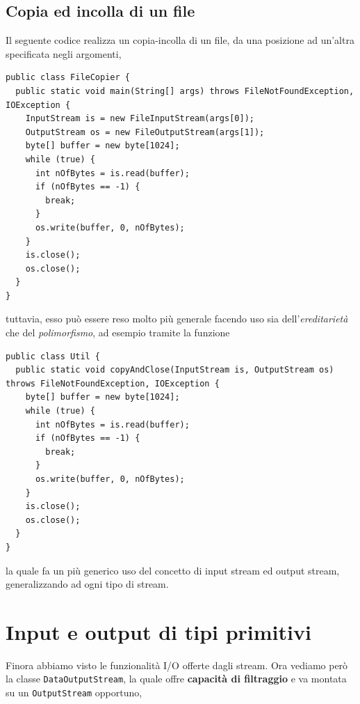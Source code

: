 \documentclass[\fontsizeclass,twocolumn]{\classname}
\theoremstyle{definition}
\theoremstyle{definition}
\begin{document}
\subsection{Copia ed incolla di un file}

Il seguente codice realizza un copia-incolla di un file, da una posizione ad
un'altra specificata negli argomenti,


\begin{lstlisting}
public class FileCopier {
  public static void main(String[] args) throws FileNotFoundException, IOException {
    InputStream is = new FileInputStream(args[0]);
    OutputStream os = new FileOutputStream(args[1]);
    byte[] buffer = new byte[1024];
    while (true) {
      int nOfBytes = is.read(buffer);
      if (nOfBytes == -1) {
        break;
      }
      os.write(buffer, 0, nOfBytes);
    }
    is.close();
    os.close();
  }
}
\end{lstlisting}


tuttavia, esso può essere reso molto più generale facendo uso sia
dell'\emph{ereditarietà} che del \emph{polimorfismo}, ad esempio tramite la
funzione

\begin{lstlisting}
public class Util {
  public static void copyAndClose(InputStream is, OutputStream os) throws FileNotFoundException, IOException {
    byte[] buffer = new byte[1024];
    while (true) {
      int nOfBytes = is.read(buffer);
      if (nOfBytes == -1) {
        break;
      }
      os.write(buffer, 0, nOfBytes);
    }
    is.close();
    os.close();
  }
}
\end{lstlisting}

la quale fa un più generico uso del concetto di input stream ed output stream,
generalizzando ad ogni tipo di stream.

\section{Input e output di tipi primitivi}

Finora abbiamo visto le funzionalità I/O offerte dagli stream. Ora vediamo però
la classe \texttt{DataOutputStream}, la quale offre \textbf{capacità di
filtraggio} e va montata su un \texttt{Output\-Stream} opportuno,
\end{document}
